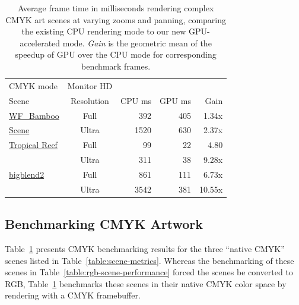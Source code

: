 \begin{table}
    \begin{tabular}{| l | c || r | r | r |}
    \hline
CMYK mode & Monitor HD    &        &        & \\
Scene & Resolution & CPU ms & GPU ms & Gain \\ \hline \hline

\hyperref[fig:bamboo]{WF\_Bamboo}	&	Full 	&  392	&	405	&	1.34x \\ %
\hspace{0.3em} \hyperref[fig:bamboo]{Scene}	&	Ultra	&1520	&	630	&	2.37x	\\ \hline

\hyperref[fig:reef]{Tropical Reef}	&	Full 	&99	&	22	&	4.80	\\  %
	&	Ultra	&311	&	38	&	9.28x	\\ \hline

\hyperref[fig:big-blend]{bigblend2} 	&	Full 	&861	&	111	&	6.73x	\\  %
	&	Ultra	&3542	&	381	&	10.55x	\\ \hline

    \hline
    \end{tabular}

\caption{Average frame time in milliseconds rendering complex CMYK art
scenes at varying
zooms and panning, comparing the existing CPU rendering mode to our new
GPU-accelerated mode.  {\em Gain} is the geometric mean of the speedup
of GPU over the CPU mode for corresponding benchmark frames.
}
\label{table:cmyk-scene-performance}

\end{table}

\subsection{Benchmarking CMYK Artwork}

Table~\ref{table:cmyk-scene-performance} presents CMYK benchmarking results for the three ``native CMYK'' scenes
listed in Table~\ref{table:scene-metrics}.
Whereas the benchmarking of these scenes in Table~\ref{table:rgb-scene-performance} forced the scenes
be converted to RGB, Table~\ref{table:cmyk-scene-performance} benchmarks these scenes in their
native CMYK color space by rendering with a CMYK framebuffer.


